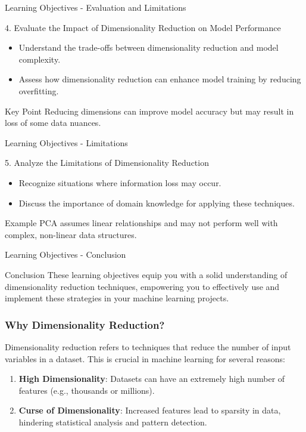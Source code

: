\documentclass[aspectratio=169]{beamer}
\begin{document}
\begin{frame}[fragile]{Learning Objectives - Evaluation and Limitations}
    \begin{block}{4. Evaluate the Impact of Dimensionality Reduction on Model Performance}
        \begin{itemize}
            \item Understand the trade-offs between dimensionality reduction and model complexity.
            \item Assess how dimensionality reduction can enhance model training by reducing overfitting.
        \end{itemize}
        \begin{block}{Key Point}
            Reducing dimensions can improve model accuracy but may result in loss of some data nuances.
        \end{block}
    \end{block}
\end{frame}

\begin{frame}[fragile]{Learning Objectives - Limitations}
    \begin{block}{5. Analyze the Limitations of Dimensionality Reduction}
        \begin{itemize}
            \item Recognize situations where information loss may occur.
            \item Discuss the importance of domain knowledge for applying these techniques.
        \end{itemize}
        \begin{block}{Example}
            PCA assumes linear relationships and may not perform well with complex, non-linear data structures.
        \end{block}
    \end{block}
\end{frame}

\begin{frame}[fragile]{Learning Objectives - Conclusion}
    \begin{block}{Conclusion}
        These learning objectives equip you with a solid understanding of dimensionality reduction techniques, empowering you to effectively use and implement these strategies in your machine learning projects.
    \end{block}
\end{frame}

\begin{frame}[fragile]
  \frametitle{Why Dimensionality Reduction?}
  Dimensionality reduction refers to techniques that reduce the number of input variables in a dataset. This is crucial in machine learning for several reasons:
  \begin{enumerate}
      \item \textbf{High Dimensionality}: Datasets can have an extremely high number of features (e.g., thousands or millions).
      \item \textbf{Curse of Dimensionality}: Increased features lead to sparsity in data, hindering statistical analysis and pattern detection.
  \end{enumerate}
\end{frame}
\end{document}
